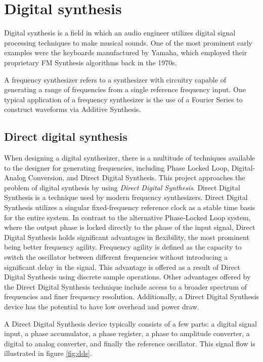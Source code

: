 \documentclass[a4paper,12pt]{report}
\begin{document}
\section{Digital synthesis}
\label{subsec:digitalsynth}
Digital synthesis is a field in which an audio engineer utilizes digital signal processing techniques to make musical sounds. One of the most prominent early examples were the keyboards manufactured by Yamaha, which employed their proprietary FM Synthesis algorithms back in the 1970s.

A frequency synthesizer refers to a synthesizer with circuitry capable of generating a range of frequencies from a single reference frequency input. One typical application of a frequency synthesizer is the use of a Fourier Series to construct waveforms via Additive Synthesis.

\subsection{Direct digital synthesis}
\label{subsec:directdigitalsynth}
When designing a digital synthesizer, there is a multitude of techniques available to the designer for generating frequencies, including Phase Locked Loop, Digital-Analog Conversion, and Direct Digital Synthesis. This project approaches the problem of digital synthesis by using \emph{Direct Digital Synthesis}. Direct Digital Synthesis is a technique used by modern frequency synthesizers. Direct Digital Synthesis utilizes a singular fixed-frequency reference clock as a stable time basis for the entire system. In contrast to the alternative Phase-Locked Loop system, where the output phase is locked directly to the phase of the input signal, Direct Digital Synthesis holds significant advantages in flexibility, the most prominent being better frequency agility. Frequency agility is defined as the capacity to switch the oscillator between different frequencies without introducing a significant delay in the signal. This advantage is offered as a result of Direct Digital Synthesis using discrete sample operations. Other advantages offered by the Direct Digital Synthesis technique include access to a broader spectrum of frequencies and finer frequency resolution. Additionally, a Direct Digital Synthesis device has the potential to have low overhead and power draw.

A Direct Digital Synthesis device typically consists of a few parts: a digital signal input, a phase accumulator, a phase register, a phase to amplitude converter, a digital to analog converter, and finally the reference oscillator. This signal flow is illustrated in figure \ref{fig:dds}.
\end{document}
